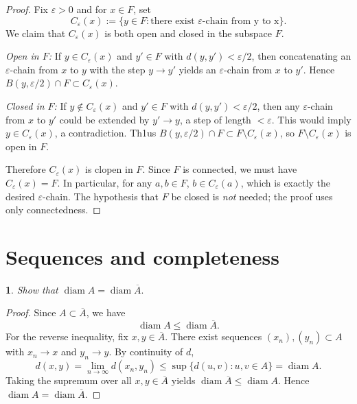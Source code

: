 \documentclass[12pt, a4paper]{report}
\theoremstyle{spaced}
\newtheorem{exercise}{}
\newcommand{\setexercise}[1]{\setcounter{exercise}{#1-1}}
\begin{document}
\begin{proof}
	Fix $\varepsilon > 0$ and	for $x \in F$, set
	\[
		C_\varepsilon(x) := \{y \in F : \text{there exist $\varepsilon$-chain from y to x}\}.
	\]
	We claim that $C_\varepsilon(x)$ is both open and closed in the subspace $F$.

	\medskip
	\noindent
	\emph{Open in $F$:}
	If $y \in C_\varepsilon(x)$ and $y' \in F$ with $d(y,y') < \varepsilon/2$, then
	concatenating an $\varepsilon$-chain from $x$ to $y$ with the step $y \to y'$
	yields an $\varepsilon$-chain from $x$ to $y'$.
	Hence $B(y,\varepsilon/2) \cap F \subset C_\varepsilon(x)$.

	\medskip
	\noindent
	\emph{Closed in $F$:}
	If $y \notin C_\varepsilon(x)$ and $y' \in F$ with $d(y,y') < \varepsilon/2$, then
	any $\varepsilon$-chain from $x$ to $y'$ could be extended by $y' \to y$, a step of
	length $< \varepsilon$. This would imply $y \in C_\varepsilon(x)$, a contradiction.
	Th1us $B(y,\varepsilon/2) \cap F \subset F \setminus C_\varepsilon(x)$, so
	$F \setminus C_\varepsilon(x)$ is open in $F$.

	\medskip
	Therefore $C_\varepsilon(x)$ is clopen in $F$. Since $F$ is connected, we must have
	$C_\varepsilon(x) = F$. In particular, for any $a,b \in F$, $b \in C_\varepsilon(a)$,
	which is exactly the desired $\varepsilon$-chain.
	The hypothesis that $F$ be closed is \emph{not} needed; the proof uses only connectedness.

\end{proof}

\section{Sequences and completeness}

\setexercise{3}
\begin{exercise}
	Show that
	\(
	\operatorname{diam} A = \operatorname{diam} \overline{A}.
	\)
\end{exercise}


\begin{proof}
	Since $A\subset\overline{A}$, we have
	\[
		\operatorname{diam}A\le \operatorname{diam}\overline{A}.
	\]
	For the reverse inequality, fix $x,y\in\overline{A}$. There exist sequences
	$(x_n),(y_n)\subset A$ with $x_n\to x$ and $y_n\to y$. By continuity of $d$,
	\[
		d(x,y)=\lim_{n\to\infty} d(x_n,y_n)\le \sup\{d(u,v):u,v\in A\}
		= \operatorname{diam}A.
	\]
	Taking the supremum over all $x,y\in\overline{A}$ yields
	$\operatorname{diam}\overline{A}\le \operatorname{diam}A$.
	Hence $\operatorname{diam}A=\operatorname{diam}\overline{A}$.
\end{proof}
\end{document}
